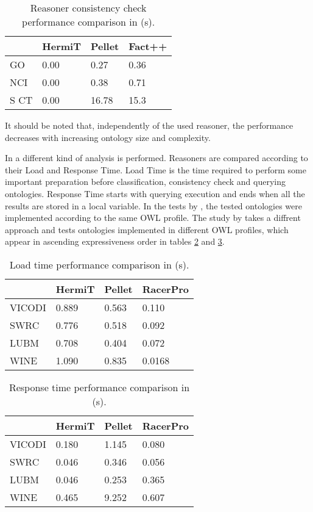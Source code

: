 \begin{table}[]
\centering
\begin{tabular}{|l|l|l|l|}
\hline
      &  HermiT  &  Pellet   &  Fact++ \\ \hline
GO    &    0.00  &  0.27     &  0.36   \\ \hline
NCI   &    0.00  &  0.38     &  0.71   \\ \hline
S CT  &    0.00  &  16.78    &  15.3   \\ \hline
\end{tabular}
\caption{Reasoner consistency check performance comparison in \cite{Dentler2011} (s).}
\label{tab:2}
\end{table}

It should be noted that, independently of the used reasoner, the performance decreases with increasing ontology size and complexity.

In \cite{Bock2008} a different kind of analysis is performed. Reasoners are compared according to their Load and Response Time.
Load Time is the time required to perform some important preparation before classification, consistency check and querying ontologies. Response Time starts with querying execution and ends when all the results are stored in a local variable. 
In the tests by \cite{Dentler2011}, the tested ontologies were implemented according to the same OWL profile. The study by \cite{Bock2008} takes a diffrent approach and tests ontologies implemented in different OWL profiles, which appear in ascending expressiveness order in tables \ref{tab:3} and \ref{tab:4}. 

\begin{table}[]
\centering
\begin{tabular}{|l|l|l|l|}
\hline
          &   HermiT  &  Pellet & RacerPro\\ \hline
VICODI    &    0.889  &  0.563  & 0.110   \\ \hline
SWRC      &    0.776  &  0.518  & 0.092   \\ \hline
LUBM      &    0.708  &  0.404  & 0.072   \\ \hline
WINE      &    1.090  &  0.835  & 0.0168  \\ \hline
\end{tabular}
\caption{Load time performance comparison in \cite{Bock2008} (s).}
\label{tab:3}
\end{table}

\begin{table}[]
\centering
\begin{tabular}{|l|l|l|l|}
\hline
          &  HermiT  &  Pellet  & RacerPro \\ \hline
VICODI    &    0.180  &  1.145  & 0.080 \\ \hline
SWRC      &    0.046  &  0.346  & 0.056 \\ \hline
LUBM      &    0.046  &  0.253  & 0.365 \\ \hline
WINE      &    0.465  &  9.252  & 0.607 \\ \hline
\end{tabular}
  \caption{Response time performance comparison in \cite{Bock2008} (s).}
\label{tab:4}
\end{table}

